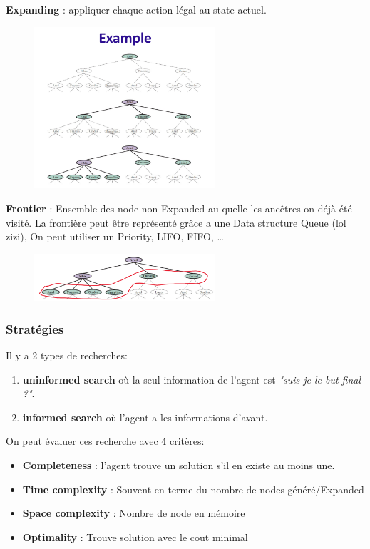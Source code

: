 		\textbf{Expanding} : appliquer chaque action légal au state actuel.
		\begin{figure}[htp]
			\centering
			\includegraphics[width=0.6\textwidth]{img/ExempleExpanding.png}
		\end{figure}
		
		\textbf{Frontier} : Ensemble des node non-Expanded au quelle les ancêtres on déjà été visité. La frontière peut être représenté grâce a une Data structure Queue (lol zizi), On peut utiliser un Priority, LIFO, FIFO, \dots
		\begin{figure}[htp]
			\centering
			\includegraphics[width=0.6\textwidth]{img/FrontierExemple.png}
		\end{figure}
		
		\subsubsection{Stratégies}
			Il y a 2 types de recherches: 
			\begin{enumerate}
				\item \textbf{uninformed search} où la seul information de l'agent est \textit{"suis-je le but final ?"}.
				\item \textbf{informed search} où l'agent a les informations d'avant.
			\end{enumerate}
			
			On peut évaluer ces recherche avec 4 critères:
			\begin{itemize}
				\item \textbf{Completeness} : l'agent trouve un solution s'il en existe au moins une.
				\item \textbf{Time complexity} : Souvent en terme du nombre de nodes généré/Expanded
				\item \textbf{Space complexity} : Nombre de node en mémoire
				\item \textbf{Optimality} : Trouve solution avec le cout minimal 
			\end{itemize}
			
